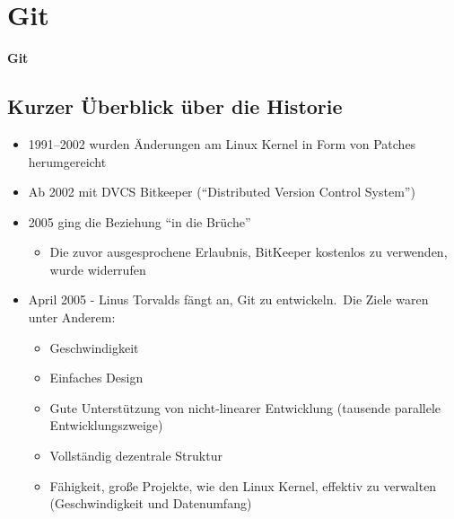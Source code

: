 \section{Git}\label{sec:git}

\begin{frame}[b]
    \begin{center}
        
    \end{center}
    \vfill
    \begin{flushleft}
        \Huge
        \textbf{Git}
    \end{flushleft}
\end{frame}

\subsection{Kurzer Überblick über die Historie}\label{subsec:kurzer-uberblick-uber-die-historie}

\begin{frame}
    \slidehead
    \vspace{-1em}
    \begin{itemize}[<+->]
        \item 1991--2002 wurden Änderungen am Linux Kernel in Form von Patches herumgereicht
        \item Ab 2002 mit DVCS Bitkeeper (\enquote{Distributed Version Control System})
        \item 2005 ging die Beziehung \enquote{in die Brüche}
            \begin{itemize}
                \item Die zuvor ausgesprochene Erlaubnis, BitKeeper kostenlos zu verwenden, wurde widerrufen
            \end{itemize}
        \item April 2005 - Linus Torvalds fängt an, Git zu entwickeln.\ Die Ziele waren unter Anderem:
            \begin{itemize}
                \item Geschwindigkeit
                \item Einfaches Design
                \item Gute Unterstützung von nicht-linearer Entwicklung (tausende parallele Entwicklungszweige)
                \item Vollständig dezentrale Struktur
                \item Fähigkeit, große Projekte, wie den Linux Kernel, effektiv zu verwalten (Geschwindigkeit und Datenumfang)
            \end{itemize}
    \end{itemize}
    \renewcommand{\thefootnote}{\relax}
\end{frame}
